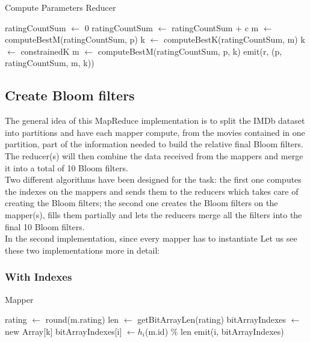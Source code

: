 \begin{algorithm}[H]
	\caption{Compute Parameters Reducer} 
	\begin{algorithmic}[1]
			\State ratingCountSum $\gets$ 0
				\State ratingCountSum $\gets$ ratingCountSum + c
			\EndFor
			 \hfill{}
				\State m $\gets$ computeBestM(ratingCountSum, p)
				\State k $\gets$ computeBestK(ratingCountSum, m)
			\Else
				\State k $\gets$ constrainedK
				\State m $\gets$ computeBestM(ratingCountSum, p, k)
			\EndIf
			\State emit(r, (p, ratingCountSum, m, k))
		\EndProcedure
	\end{algorithmic} 
\end{algorithm}

\subsection{Create Bloom filters}
The general idea of this MapReduce implementation is to split the IMDb dataset into partitions and have each mapper compute, from the movies contained in one partition, part of the information needed to build the relative final Bloom filters.
The reducer(s) will then combine the data received from the mappers and merge it into a total of 10 Bloom filters.\\
Two different algorithms have been designed for the task: the first one computes the indexes on the mappers and sends them to the reducers which takes care of creating the Bloom filters; the second one creates the Bloom filters on the mapper(s), fills them partially and lets the reducers merge all the filters into the final 10 Bloom filters.\\
In the second implementation, since every mapper has to instantiate
Let us see these two implementations more in detail:



\subsubsection{With Indexes}
\begin{algorithm}[H]
	\caption{Mapper} 
	\begin{algorithmic}[1]
				\State rating $\gets$ round(m.rating)
				\State len $\gets$ getBitArrayLen(rating)
				\State bitArrayIndexes $\gets$ new Array[k]
					\State bitArrayIndexes[i] $\gets h_{i}$(m.id) $\%$ len
					\State emit(i, bitArrayIndexes)
				\EndFor
			\EndFor
		\EndProcedure
	\end{algorithmic} 
\end{algorithm}

